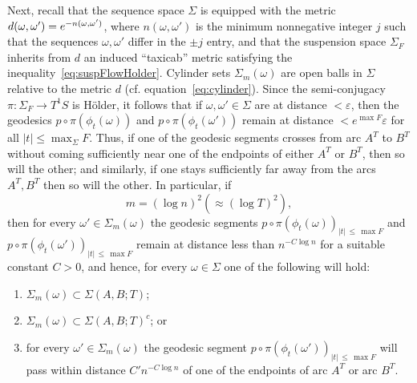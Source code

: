 \documentclass[AHL, Unicode, longabstracts, published]{cedram}
\newcommand*{\romanenumi}{\renewcommand*{\theenumi}{\roman{enumi}}}
\begin{document}
Next, recall that the sequence space $\Sigma$ is equipped with the metric $d(\omega,\omega') \linebreak= e^{-n(\omega,\omega')}$, where $n(\omega,\omega')$ is the minimum nonnegative integer $j$ such that the sequences $\omega,\omega'$ differ in the $\pm j$ entry, and that the suspension space $\Sigma_{F}$ inherits from $d$ an induced ``taxicab'' metric satisfying the inequality~\eqref{eq:suspFlowHolder}. Cylinder sets $\Sigma_{m}(\omega)$ are open balls in $\Sigma$ relative to the metric $d$ (cf. equation~\eqref{eq:cylinder}). Since the semi-conjugacy $\pi: \Sigma_{F}\rightarrow T^{1}S$ is H\"older, it follows that if $\omega, \omega' \in \Sigma$ are at distance $<\varepsilon$, then the geodesics $p\circ\pi(\phi_{t}(\omega))$ and $p\circ\pi (\phi_{t}(\omega'))$ remain at distance $< e^{\max F}\varepsilon$ for all $|t|\leq \max_{\Sigma}F$. Thus, if one of the geodesic segments crosses from arc $A^{T}$ to $B^{T}$ without coming sufficiently near one of the endpoints of either $A^{T}$ or $B^{T}$, then so will the other; and similarly, if one stays sufficiently far away from the arcs $A^{T},B^{T}$ then so will the other. In particular, if
\begin{equation}\label{eq:m:n}
m= (\log n)^{2} (\approx (\log T)^{2}),
\end{equation}
then for every $\omega' \in \Sigma_{m}(\omega)$ the geodesic segments $p\circ\pi (\phi_{t}(\omega))_{|t|\,\leq \,\max F}$ and $p\circ\pi (\phi_{t}(\omega'))_{|t|\,\leq\, \max F}$ remain at distance less than $n^{-C \log n}$ for a suitable constant $C>0$, and hence, for every $\omega \in \Sigma$ one of the following will hold:
\begin{enumerate}\romanenumi
\item \label{listproof7.1.1}$\Sigma_{m}(\omega) \subset \Sigma(A,B;T)$;
\item \label{listproof7.1.2}$\Sigma_{m}(\omega)\subset \Sigma(A,B;T)^{c}$; or
\item \label{listproof7.1.3}for every $\omega' \in\Sigma_{m}(\omega)$ the geodesic segment $p\circ\pi (\phi_{t}(\omega'))_{|t|\,\leq\,\max F}$ will pass within distance $C' n^{-C \log n}$ of one of the endpoints of arc $A^{T}$ or arc $B^{T}$.
\end{enumerate}
\end{document}
